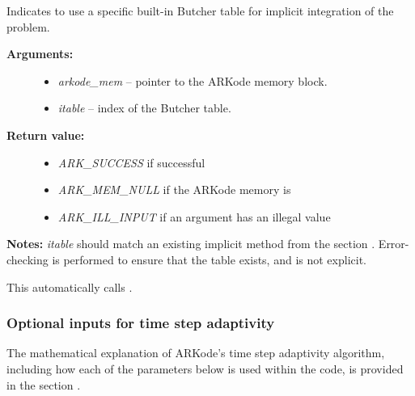 \documentclass[letterpaper,10pt,english]{sphinxmanual}
\begin{document}
\begin{fulllineitems}
\label{c_interface/User_callable:c.ARKodeSetIRKTableNum}
Indicates to use a specific built-in Butcher table for implicit
integration of the problem.
\begin{description}
\item[{\textbf{Arguments:}}] \leavevmode\begin{itemize}
\item {} 
\emph{arkode\_mem} -- pointer to the ARKode memory block.

\item {} 
\emph{itable} -- index of the Butcher table.

\end{itemize}

\item[{\textbf{Return value:}}] \leavevmode\begin{itemize}
\item {} 
\emph{ARK\_SUCCESS} if successful

\item {} 
\emph{ARK\_MEM\_NULL} if the ARKode memory is 

\item {} 
\emph{ARK\_ILL\_INPUT} if an argument has an illegal value

\end{itemize}

\end{description}

\textbf{Notes:} \emph{itable} should match an existing implicit method from
the section {\hyperref[Butcher:butcher-implicit]{\emph{}}}.  Error-checking is performed
to ensure that the table exists, and is not explicit.

This automatically calls {\hyperref[c_interface/User_callable:c.ARKodeSetImplicit]{\emph{}}}.

\end{fulllineitems}



\subsubsection{Optional inputs for time step adaptivity}
\label{c_interface/User_callable:cinterface-arkodeadaptivityinputtable}\label{c_interface/User_callable:optional-inputs-for-time-step-adaptivity}
The mathematical explanation of ARKode's time step adaptivity
algorithm, including how each of the parameters below is used within
the code, is provided in the section {\hyperref[Mathematics:mathematics-adaptivity]{\emph{}}}.
\end{document}
